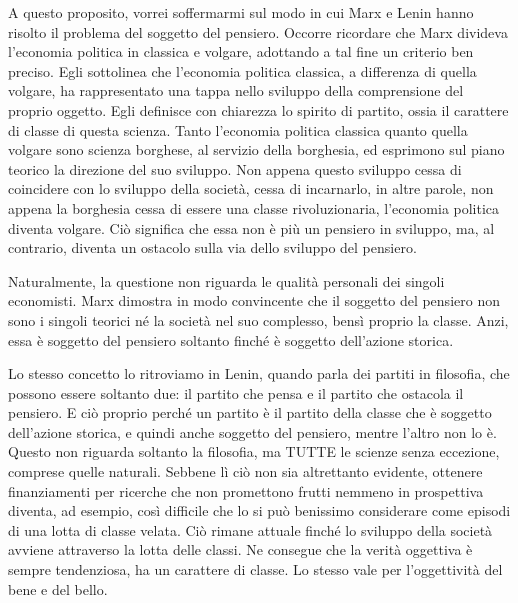 \documentclass[12pt,a4paper,openany]{book}
\begin{document}
A questo proposito, vorrei soffermarmi sul modo in cui Marx e Lenin hanno risolto il problema del soggetto del pensiero. Occorre ricordare che Marx divideva l'economia politica in classica e volgare, adottando a tal fine un criterio ben preciso. Egli sottolinea che l'economia politica classica, a differenza di quella volgare, ha rappresentato una tappa nello sviluppo della comprensione del proprio oggetto. Egli definisce con chiarezza lo spirito di partito, ossia il carattere di classe di questa scienza. Tanto l'economia politica classica quanto quella volgare sono scienza borghese, al servizio della borghesia, ed esprimono sul piano teorico la direzione del suo sviluppo. Non appena questo sviluppo cessa di coincidere con lo sviluppo della società, cessa di incarnarlo, in altre parole, non appena la borghesia cessa di essere una classe rivoluzionaria, l'economia politica diventa volgare. Ciò significa che essa non è più un pensiero in sviluppo, ma, al contrario, diventa un ostacolo sulla via dello sviluppo del pensiero.

Naturalmente, la questione non riguarda le qualità personali dei singoli economisti. Marx dimostra in modo convincente che il soggetto del pensiero non sono i singoli teorici né la società nel suo complesso, bensì proprio la classe. Anzi, essa è soggetto del pensiero soltanto finché è soggetto dell'azione storica.

Lo stesso concetto lo ritroviamo in Lenin, quando parla dei partiti in filosofia, che possono essere soltanto due: il partito che pensa e il partito che ostacola il pensiero. E ciò proprio perché un partito è il partito della classe che è soggetto dell'azione storica, e quindi anche soggetto del pensiero, mentre l'altro non lo è. Questo non riguarda soltanto la filosofia, ma TUTTE le scienze senza eccezione, comprese quelle naturali. Sebbene lì ciò non sia altrettanto evidente, ottenere finanziamenti per ricerche che non promettono frutti nemmeno in prospettiva diventa, ad esempio, così difficile che lo si può benissimo considerare come episodi di una lotta di classe velata. Ciò rimane attuale finché lo sviluppo della società avviene attraverso la lotta delle classi. Ne consegue che la verità oggettiva è sempre tendenziosa, ha un carattere di classe. Lo stesso vale per l'oggettività del bene e del bello.
\end{document}
